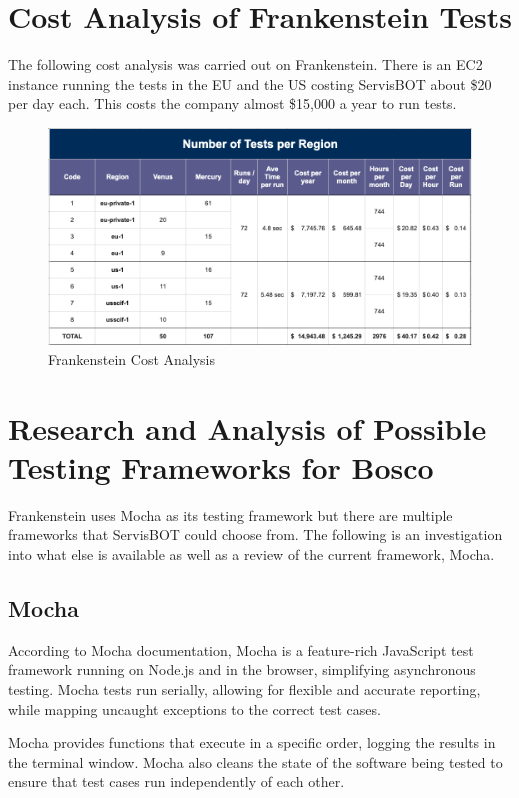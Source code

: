\documentclass[12pt,a4paper,titlepage]{report}
\begin{document}
\clearpage
\section{Cost Analysis of Frankenstein Tests}

The following cost analysis was carried out on Frankenstein. There is an EC2 instance running the tests in the EU and the US costing ServisBOT about \$20 per day each. This costs the company almost \$15,000 a year to run tests.

\begin{figure}[ht]
 \centering
 \includegraphics[width=\textwidth,height=\textheight,keepaspectratio]{./diagrams/frank_cost_analysis.png}
 \caption{Frankenstein Cost Analysis}
\end{figure}

\section{Research and Analysis of Possible Testing Frameworks for Bosco}

Frankenstein uses Mocha as its testing framework but there are multiple frameworks that ServisBOT could choose from. The following is an investigation into what else is available as well as a review of the current framework, Mocha.
\subsection{Mocha}

According to Mocha documentation, Mocha is a feature-rich JavaScript test framework running on Node.js and in the browser, simplifying asynchronous
testing. Mocha tests run serially, allowing for flexible and accurate reporting, while mapping uncaught
exceptions to the correct test cases. \autocite{Mocha}

Mocha provides functions that execute in a specific order, logging the
results in the terminal window. Mocha also cleans the state of the software being tested to ensure that test
cases run independently of each other.
\end{document}
